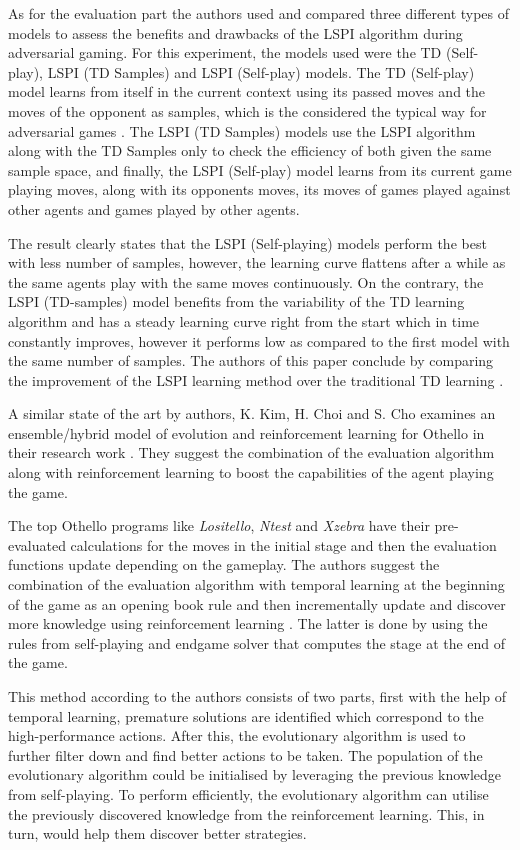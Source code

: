 \documentclass{svproc}
\begin{document}
As for the evaluation part the authors used and compared three different types of models to assess the benefits and drawbacks of the LSPI algorithm during adversarial gaming. For this experiment, the models used were the TD (Self-play), LSPI (TD Samples) and LSPI (Self-play) models. The TD (Self-play) model learns from itself in the current context using its passed moves and the moves of the opponent as samples, which is the considered the typical way for adversarial games \cite{esmond_1}. The LSPI (TD Samples) models use the LSPI algorithm along with the TD Samples only to check the efficiency of both given the same sample space, and finally, the LSPI (Self-play) model learns from its current game playing moves, along with its opponents moves, its moves of games played against other agents and games played by other agents.

The result clearly states that the LSPI (Self-playing) models perform the best with less number of samples, however, the learning curve flattens after a while as the same agents play with the same moves continuously. On the contrary, the LSPI (TD-samples) model benefits from the variability of the TD learning algorithm and has a steady learning curve right from the start which in time constantly improves, however it performs low as compared to the first model with the same number of samples. The authors of this paper conclude by comparing the improvement of the LSPI learning method over the traditional TD learning \cite{esmond_1}.

A similar state of the art by authors, K. Kim, H. Choi and S. Cho examines an ensemble/hybrid model of evolution and reinforcement learning for Othello in their research work \cite{esmond_2}. They suggest the combination of the evaluation algorithm along with reinforcement learning to boost the capabilities of the agent playing the game.

The top Othello programs like \emph{Lositello}, \emph{Ntest} and \emph{Xzebra} have their pre-evaluated calculations for the moves in the initial stage and then the evaluation functions update depending on the gameplay. The authors suggest the combination of the evaluation algorithm with temporal learning at the beginning of the game as an opening book rule and then incrementally update and discover more knowledge using reinforcement learning \cite{esmond_2}. The latter is done by using the rules from self-playing and endgame solver that computes the stage at the end of the game.

This method according to the authors consists of two parts, first with the help of temporal learning, premature solutions are identified which correspond to the high-performance actions. After this, the evolutionary algorithm is used to further filter down and find better actions to be taken. The population of the evolutionary algorithm could be initialised by leveraging the previous knowledge from self-playing. To perform efficiently, the evolutionary algorithm can utilise the previously discovered knowledge from the reinforcement learning. This, in turn, would help them discover better strategies.
\end{document}
